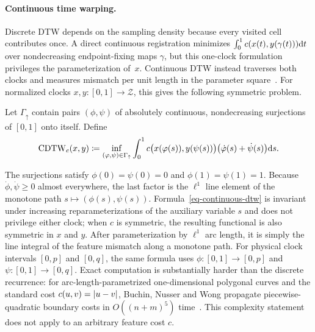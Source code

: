 \paragraph{Continuous time warping.}
Discrete DTW depends on the sampling density because every visited cell contributes once. A direct continuous registration minimizes $\int_0^1 c(x(t),y(\gamma(t)))\mathrm{d} t$ over nondecreasing endpoint-fixing maps $\gamma$, but this one-clock formulation privileges the parameterization of~$x$. Continuous DTW instead traverses both clocks and measures mismatch per unit length in the parameter square~\cite{BuchinNusserWong2022CDTW}. For normalized clocks $x,y:[0,1]\to\mathcal Z$, this gives the following symmetric problem.
\begin{defn}\label{def-continuous-dtw}
Let $\Gamma_\uparrow$ contain pairs $(\phi,\psi)$ of absolutely continuous, nondecreasing surjections of $[0,1]$ onto itself. Define
\begin{equation}\label{eq-continuous-dtw}
	\mathrm{CDTW}_c(x,y)
	\coloneqq
	\inf_{(\varphi,\psi)\in\Gamma_\uparrow}
	\int_0^1
	c\bigl(x(\varphi(s)),y(\psi(s))\bigr)
	\bigl(\dot{\varphi}(s)+\dot\psi(s)\bigr)\mathrm{d} s.
\end{equation}
\end{defn}
The surjections satisfy $\phi(0)=\psi(0)=0$ and $\phi(1)=\psi(1)=1$. Because $\dot\phi,\dot\psi\geq0$ almost everywhere, the last factor is the $\ell^1$ line element of the monotone path $s\mapsto(\phi(s),\psi(s))$. Formula~\eqref{eq-continuous-dtw} is invariant under increasing reparameterizations of the auxiliary variable $s$ and does not privilege either clock; when $c$ is symmetric, the resulting functional is also symmetric in $x$ and $y$. After parameterization by $\ell^1$ arc length, it is simply the line integral of the feature mismatch along a monotone path. For physical clock intervals $[0,p]$ and $[0,q]$, the same formula uses $\phi:[0,1]\to[0,p]$ and $\psi:[0,1]\to[0,q]$. Exact computation is substantially harder than the discrete recurrence: for arc-length-parametrized one-dimensional polygonal curves and the standard cost $c(u,v)=\left\lvert u-v\right\rvert$, Buchin, Nusser and Wong propagate piecewise-quadratic boundary costs in $O((n+m)^5)$ time~\cite{BuchinNusserWong2022CDTW}. This complexity statement does not apply to an arbitrary feature cost $c$.

